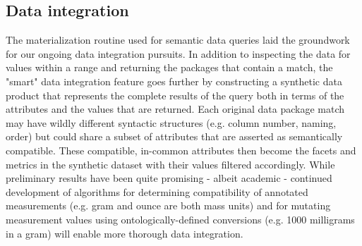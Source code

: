 \subsection{Data integration}
The materialization routine used for semantic data queries laid the groundwork for our ongoing data integration pursuits.
In addition to inspecting the data for values within a range and returning the packages that contain a match, the "smart" data integration feature goes further by constructing a synthetic data product that represents the complete results of the query both in terms of the attributes and the values that are returned. Each original data package match may have wildly different syntactic structures (e.g. column number, naming, order) but could share a subset of attributes that are asserted as semantically compatible. These compatible, in-common attributes then become the facets and metrics in the synthetic dataset with their values filtered accordingly. While preliminary results have been quite promising - albeit academic - continued development of algorithms for determining compatibility of annotated measurements (e.g. gram and ounce are both mass units) and for mutating measurement values using ontologically-defined conversions (e.g. 1000 milligrams in a gram) will enable more thorough data integration.


